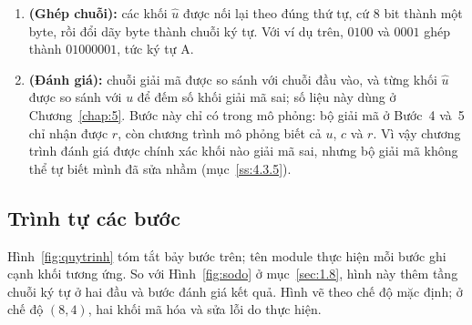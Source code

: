 \begin{enumerate}[label=\textbf{Bước~\arabic*},leftmargin=2.3cm,labelwidth=1.7cm,labelsep=0.6em,align=left]
        Kết quả là từ mã sau sửa $\hat{c}$; dữ liệu giải mã $\hat{u}$ là $4$
        bit đầu của $\hat{c}$. Khi khối có không quá một bit lỗi thì
        $\hat{u} = u$. Ở chế độ $(8,4)$, việc sửa theo Bảng~\ref{tab:84}: khi
        $s \neq 0$ và $q = 0$, khối được báo phát hiện hai lỗi và không được
        sửa (mục~\ref{ss:4.3.6}).
  \item \textbf{(Ghép chuỗi):} các khối $\hat{u}$ được nối lại theo đúng thứ
        tự, cứ $8$ bit thành một byte, rồi đổi dãy byte thành chuỗi ký tự. Với
        ví dụ trên, $0100$ và $0001$ ghép thành $01000001$, tức ký tự A.
  \item \textbf{(Đánh giá):} chuỗi giải mã được so sánh với chuỗi đầu vào, và
        từng khối $\hat{u}$ được so sánh với $u$ để đếm số khối giải mã sai;
        số liệu này dùng ở Chương~\ref{chap:5}. Bước này chỉ có trong mô
        phỏng: bộ giải mã ở Bước~4 và~5 chỉ nhận được $r$, còn chương trình mô
        phỏng biết cả $u$, $c$ và $r$. Vì vậy chương trình đánh giá được chính
        xác khối nào giải mã sai, nhưng bộ giải mã không thể tự biết mình đã
        sửa nhầm (mục~\ref{ss:4.3.5}).
\end{enumerate}

\subsection{Trình tự các bước}
\label{ss:4.1.2}

Hình~\ref{fig:quytrinh} tóm tắt bảy bước trên; tên module thực hiện mỗi bước
ghi cạnh khối tương ứng. So với Hình~\ref{fig:sodo} ở mục~\ref{sec:1.8}, hình
này thêm tầng chuỗi ký tự ở hai đầu và bước đánh giá kết quả. Hình vẽ theo
chế độ mặc định; ở chế độ $(8,4)$, hai khối mã hóa và sửa lỗi do
 thực hiện.

